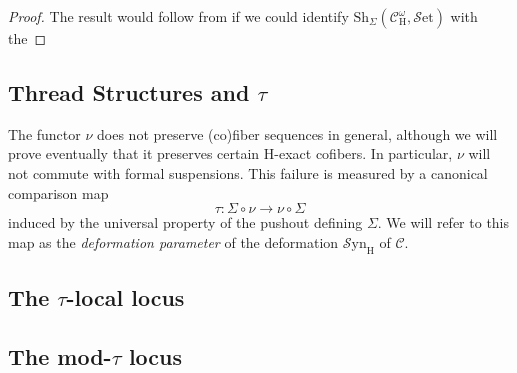 \documentclass[10pt]{amsart}
\theoremstyle{definition}
\numberwithin{figure}{section}
\numberwithin{equation}{section}
\newcommand{\cC}{\mathcal{C}}
\theoremstyle{cited}
\newcommand{\Set}{{\mathcal{S}\mathrm{et}}}
\newcommand{\Sh}{\mathrm{Sh}}
\newcommand{\Syn}{\mathcal{S}\mathrm{yn}}
\renewcommand{\H}{\mathrm{H}}
\begin{document}
\begin{proof}
  The result would follow from \cite[Proposition 2.16]{Pst22} if we could identify $\Sh_{\Sigma}(\cC_{\H}^\omega, \Set)$ with the 
\end{proof}



\subsection{Thread Structures and $\tau$}

The functor $\nu$ does not preserve (co)fiber sequences in general, although we will prove eventually that it preserves certain $\H$-exact cofibers. In particular, $\nu$ will not commute with formal suspensions. This failure is measured by a canonical comparison map
\[
\tau: \Sigma \circ \nu \to \nu \circ \Sigma
\]
induced by the universal property of the pushout defining $\Sigma$. We will refer to this map as the \textit{deformation parameter} of the deformation $\Syn_\H$ of $\cC$. 

\subsection{The $\tau$-local locus}

\subsection{The mod-$\tau$ locus}
\end{document}
